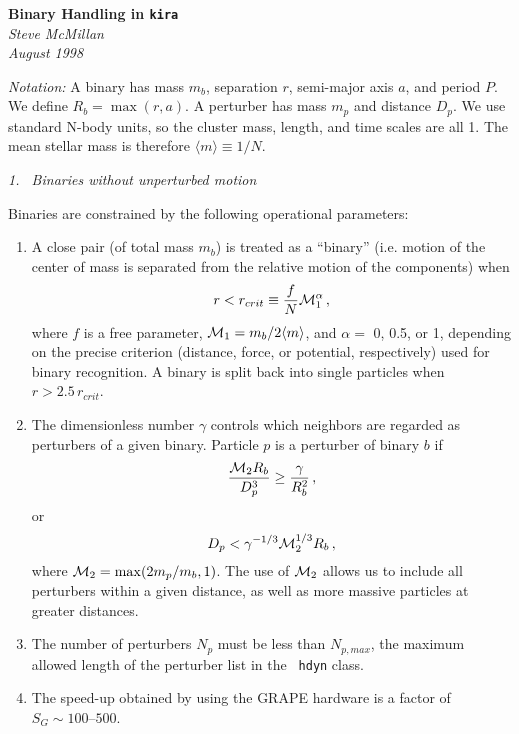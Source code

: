 \documentclass{article}
\newcommand{\mbar}{\langle m \rangle}
\begin{document}
\begin{center}
	\LARGE{\bf Binary Handling in {\tt kira}}\\
\vskip 6pt
	\Large{\it Steve McMillan}\\
	{\it August 1998}
\end{center}

\bigskip
\noindent
{\it Notation:} A binary has mass $m_b$, separation $r$, semi-major
axis $a$, and period $P$.  We define $R_b = \max(r,a)$.  A perturber
has mass $m_p$ and distance $D_p$.  We use standard N-body units, so
the cluster mass, length, and time scales are all 1.  The mean stellar
mass is therefore $\mbar \equiv 1/N$.

\bigskip\bigskip\noindent
{\large\it 1.~ Binaries without unperturbed motion}

\bigskip\noindent Binaries are constrained by the following
operational parameters:

\begin{enumerate}

\item	A close pair (of total mass $m_b$) is treated as a ``binary''
	(i.e. motion of the center of mass is separated from the
	relative motion of the components) when 
$$
	r < r_{crit} \equiv \frac{f}{N} {\cal M}_1^\alpha\,,
$$
	where $f$ is a free parameter, ${\cal M}_1 = m_b/2\mbar$, and
	$\alpha =$ 0, 0.5, or 1, depending on the precise criterion
	(distance, force, or potential, respectively) used for binary
	recognition.  A binary is split back into single particles
	when $r > 2.5\, r_{crit}$.

\item	The dimensionless number $\gamma$ controls which neighbors are
	regarded as perturbers of a given binary.  Particle $p$ is a
	perturber of binary $b$ if
$$
	\frac{{\cal M}_2 R_b}{D_p^3} \ge \frac{\gamma}{R_b^2}\,,
$$
	or
$$
	D_p < \gamma^{-1/3} {\cal M}_2^{1/3} R_b\,,
$$
	where ${\cal M}_2 = \max(2m_p/m_b, 1)$.  The use of ${\cal
	M}_2$ allows us to include all perturbers within a given
	distance, as well as more massive particles at greater
	distances.

\item	The number of perturbers $N_p$ must be less than $N_{p,max}$,
	the maximum allowed length of the perturber list in the {\tt
	hdyn} class.

\item	The speed-up obtained by using the GRAPE hardware is a factor
	of $S_G \sim 100$--$500$.

\end{enumerate}
\end{document}
